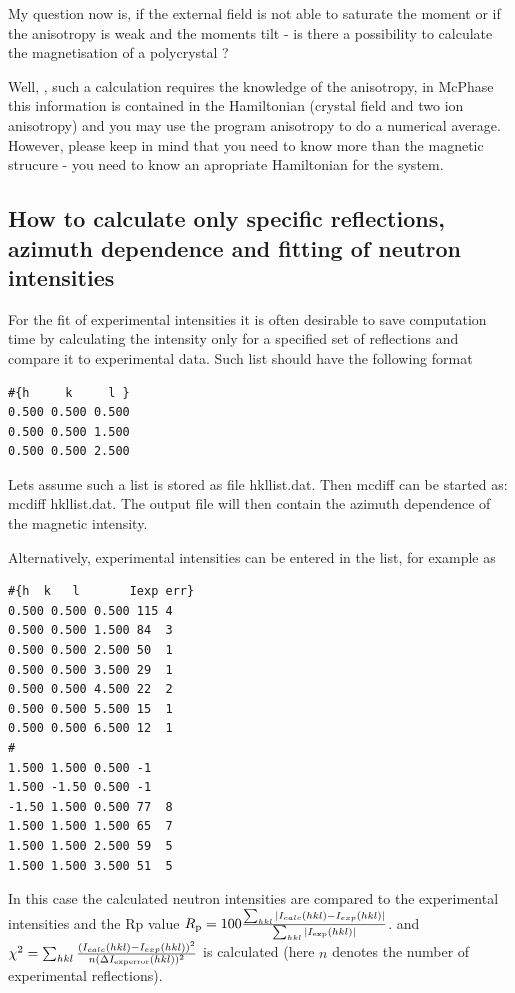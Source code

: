 My question now is, if the external field is not able to saturate the moment or if the 
anisotropy is weak and the moments tilt - is there a possibility to calculate the magnetisation of
a polycrystal ?

\EE Well, \oo, such a calculation requires the knowledge of the anisotropy, in {\prg McPhase} this
information is contained in the Hamiltonian (crystal field and two ion anisotropy) and you may use the
program {\prg anisotropy} to do a numerical average. However, please keep in mind that you need to
know more than the magnetic strucure - you need to know an apropriate Hamiltonian for the system.

\subsection{How to calculate only specific reflections, azimuth dependence and fitting of neutron %
intensities}

For the fit of experimental intensities it is often desirable to save computation
time by calculating the intensity only for a specified set of reflections and 
compare it to experimental data. Such list should have the following format

\begin{verbatim}
#{h     k     l }
0.500 0.500 0.500 
0.500 0.500 1.500 
0.500 0.500 2.500 
\end{verbatim}

Lets assume such a list is stored  as file {\prg hkllist.dat}.
Then {\prg mcdiff} can be started as: {\prg mcdiff hkllist.dat}.
The output file will then contain the azimuth dependence of the magnetic intensity.

Alternatively, experimental intensities can be entered in the list, for example as

\begin{verbatim}
#{h  k   l       Iexp err}
0.500 0.500 0.500 115 4
0.500 0.500 1.500 84  3
0.500 0.500 2.500 50  1
0.500 0.500 3.500 29  1
0.500 0.500 4.500 22  2
0.500 0.500 5.500 15  1
0.500 0.500 6.500 12  1
#
1.500 1.500 0.500 -1
1.500 -1.50 0.500 -1
-1.50 1.500 0.500 77  8
1.500 1.500 1.500 65  7
1.500 1.500 2.500 59  5
1.500 1.500 3.500 51  5
\end{verbatim}

In this case the calculated neutron intensities are compared to
the experimental intensities and the Rp value $R_{\rm p}=100
\frac{\sum_{hkl} |I_{calc}(hkl)-I_{exp}(hkl)|}{\sum_{hkl}|I_{\rm
exp}(hkl)|}$. and $\chi^2=\sum_{hkl}\frac{ (I_{calc}(hkl)-I_{exp}(hkl))^2}{n(\Delta I_{\rm
experror}(hkl))^2}$
is calculated (here $n$ denotes the number of experimental reflections). 

